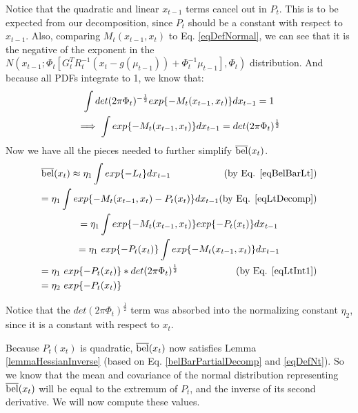 Notice that the quadratic and linear \(x_{t-1}\) terms cancel out in \(P_t\). This is to be expected from our decomposition, since \(P_t\) should be a constant with respect to \(x_{t-1}\). Also, comparing \(M_t(x_{t-1},x_t)\) to Eq. \ref{eqDefNormal}, we can see that it is the negative of the exponent in the \(N(x_{t-1};\Phi_t [G_t^T R_t^{-1}  (x_t - g(\mu_{t-1})) + \Phi_t^{-1} \mu_{t-1}], \Phi_t)\) distribution. And because all PDFs integrate to 1, we know that:
\begin{multline} \label{eqLtInt1}
\int det(2 \pi \Phi_t)^{-\frac{1}{2}} exp\{-M_t(x_{t-1},x_t)\}dx_{t-1} = 1 \\
\implies \int exp\{-M_t(x_{t-1},x_t)\}dx_{t-1} = det(2 \pi \Phi_t)^{\frac{1}{2}} \hfill
\end{multline}
Now we have all the pieces needed to further simplify \(\overline{\mathrm{bel}}(x_t)\).
\begin{multline} \label{belBarPartialDecomp}
\overline{\bel}(x_t) \approx \eta_1 \int exp\{-L_t\}dx_{t-1} \hfill \text{(by Eq. \ref{eqBelBarLt})} \\
= \eta_1 \int exp\{-M_t(x_{t-1},x_t) - P_t(x_t)\}dx_{t-1} \hfill \text{(by Eq. \ref{eqLtDecomp})} \\
= \eta_1 \int exp\{-M_t(x_{t-1},x_t)\} exp \{ - P_t(x_t)\}dx_{t-1} \\
= \eta_1\ exp \{ - P_t(x_t)\} \int exp\{-M_t(x_{t-1},x_t)\} dx_{t-1} \\
= \eta_1\ exp \{ - P_t(x_t)\} * det(2 \pi \Phi_t)^{\frac{1}{2}} \hfill \text{(by Eq. \ref{eqLtInt1})} \\
= \eta_2\ exp \{ - P_t(x_t)\} \hfill
\end{multline}

Notice that the \(det(2 \pi \Phi_t)^{\frac{1}{2}}\) term was absorbed into the normalizing constant \(\eta_2\), since it is a constant with respect to \(x_t\).

Because \(P_t(x_t)\) is quadratic, \(\overline{\mathrm{bel}}(x_t)\) now satisfies Lemma \ref{lemmaHessianInverse} (based on Eq. \ref{belBarPartialDecomp} and \ref{eqDefNt}). So we know that the mean and covariance of the normal distribution representing \(\overline{\mathrm{bel}}(x_t)\) will be equal to the extremum of \(P_t\), and the inverse of its second derivative. We will now compute these values.

